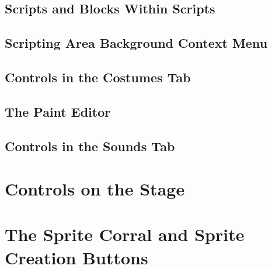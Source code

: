 \documentclass[a4paper]{report}
\begin{document}
\subsection{Scripts and Blocks Within Scripts}
\subsection{Scripting Area Background Context Menu}
\subsection{Controls in the Costumes Tab}
\subsection{The Paint Editor}
\subsection{Controls in the Sounds Tab}
\section{Controls on the Stage}
\section{The Sprite Corral and Sprite Creation Buttons}
\end{document}
